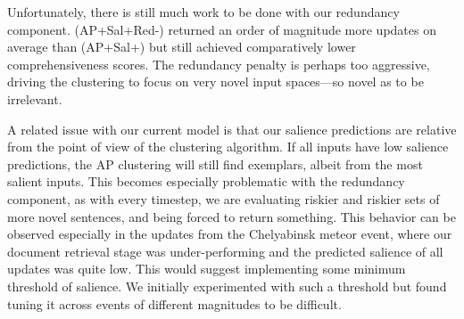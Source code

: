 \documentclass{sig-alternate}
\begin{document}
Unfortunately, there is still much work to be done with our redundancy 
component. (AP+Sal+Red-) returned an order of magnitude more updates on 
average than (AP+Sal+) but still achieved comparatively lower comprehensiveness
scores. The redundancy penalty is perhaps too aggressive, driving the 
clustering to focus on very novel input spaces---so novel as to be 
irrelevant. 

A related issue with our current model is that our salience predictions
are relative from the point of view of the clustering algorithm. If all inputs
have low salience predictions, the AP clustering will still find exemplars, 
albeit from the most salient inputs. This becomes especially problematic 
with the redundancy component, as with every timestep, we are evaluating 
riskier and riskier sets of more novel sentences, and being forced to return
something. This behavior can be observed especially in the updates from the
Chelyabinsk meteor event, where our document retrieval stage was 
under-performing and the predicted salience of all updates was quite low.
This would suggest implementing some minimum threshold of salience. We
initially experimented with such a threshold but found tuning it across 
events of different magnitudes to be difficult. 




%
%
\end{document}
